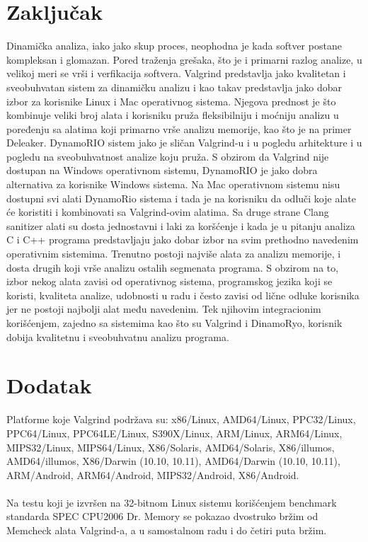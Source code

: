 \documentclass[a4paper]{article}
\begin{document}
\section{Zaključak}
\label{sec:zakljucak}
Dinamička analiza, iako jako skup proces, neophodna je kada softver postane kompleksan i glomazan. Pored traženja grešaka, što je i primarni razlog analize, u velikoj meri se vrši i verfikacija softvera. Valgrind predstavlja jako kvalitetan i sveobuhvatan sistem za dinamičku analizu i kao takav predstavlja jako dobar izbor za korisnike Linux i Mac operativnog sistema. Njegova prednost je što kombinuje veliki broj alata i korisniku pruža fleksibilniju i moćniju analizu u poređenju sa alatima koji primarno vrše analizu memorije, kao što je na primer Deleaker. DynamoRIO sistem jako je sličan Valgrind-u i u pogledu arhitekture i u pogledu na sveobuhvatnost analize koju pruža. S obzirom da Valgrind nije dostupan na Windows operativnom sistemu, DynamoRIO je jako dobra alternativa za korisnike Windows sistema. Na Mac operativnom sistemu nisu dostupni svi alati DynamoRio sistema i tada je na korisniku da odluči koje alate će koristiti i kombinovati sa Valgrind-ovim alatima. Sa druge strane Clang sanitizer alati su dosta jednostavni i laki za koršćenje i kada je u pitanju analiza C i C++ programa predstavljaju jako dobar izbor na svim prethodno navedenim operativnim sistemima. Trenutno postoji najviše alata za analizu memorije, i dosta drugih koji vrše analizu ostalih segmenata programa. S obzirom na to, izbor nekog alata zavisi od operativnog sistema, programskog jezika koji se koristi, kvaliteta analize, udobnosti u radu i često zavisi od lične odluke korisnika jer ne postoji najbolji alat među navedenim. Tek njihovim integracionim korišćenjem, zajedno sa sistemima kao što su Valgrind i DinamoRyo, korisnik dobija kvalitetnu i sveobuhvatnu analizu programa.


\appendix
 


\appendix
\section{Dodatak}
Platforme koje Valgrind podržava su: x86/Linux, AMD64/Linux, PPC32/Linux, PPC64/Linux, PPC64LE/Linux, S390X/Linux, ARM/Linux, ARM64/Linux, MIPS32/Linux, MIPS64/Linux, X86/Solaris, AMD64/Solaris, X86/illumos, AMD64/illumos, X86/Darwin (10.10, 10.11), AMD64/Darwin (10.10, 10.11), ARM/Android, ARM64/Android, MIPS32/Android, X86/Android.\cite{valgrind-platforms}
\\ 
\\
Na testu koji je izvršen na 32-bitnom Linux sistemu korišćenjem benchmark standarda SPEC CPU2006 Dr. Memory se pokazao dvostruko bržim od Memcheck alata Valgrind-a, a u samostalnom radu i do četiri puta bržim.\cite{drmemory-paper}
\end{document}
